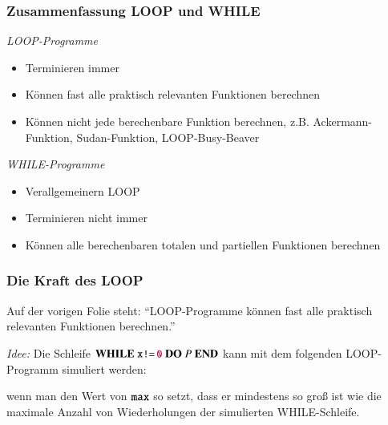 \documentclass[aspectratio=1610,onlymath]{beamer}
\begin{document}
\maketitle

% 
% 
% 
% 



\begin{frame}\frametitle{Zusammenfassung LOOP und WHILE}

\emph{LOOP-Programme}
\begin{itemize}
\item Terminieren immer
\item Können fast alle praktisch relevanten Funktionen berechnen
\item Können nicht jede berechenbare Funktion berechnen, z.B. Ackermann-Funktion, Sudan-Funktion, LOOP-Busy-Beaver
\end{itemize}
\bigskip

\emph{WHILE-Programme}
\begin{itemize}
\item Verallgemeinern LOOP
\item Terminieren nicht immer
\item Können alle berechenbaren totalen und partiellen Funktionen berechnen
\end{itemize}

\end{frame}

\begin{frame}\frametitle{Die Kraft des LOOP}

Auf der vorigen Folie steht: "`LOOP-Programme können fast alle praktisch relevanten Funktionen berechnen."'
\medskip

\bigskip\pause

\emph{Idee:} Die Schleife $\textbf{WHILE}~\texttt{x}\texttt{!=}\,\texttt{\textcolor{purple}{0}}~\textbf{DO}~P~\textbf{END}$ kann mit dem folgenden LOOP-Programm simuliert werden:\medskip

\pause

wenn man den Wert von $\texttt{max}$ so setzt, dass er \alert{mindestens} so groß ist
wie die maximale Anzahl von Wiederholungen der simulierten WHILE-Schleife.

\end{frame}
\end{document}
